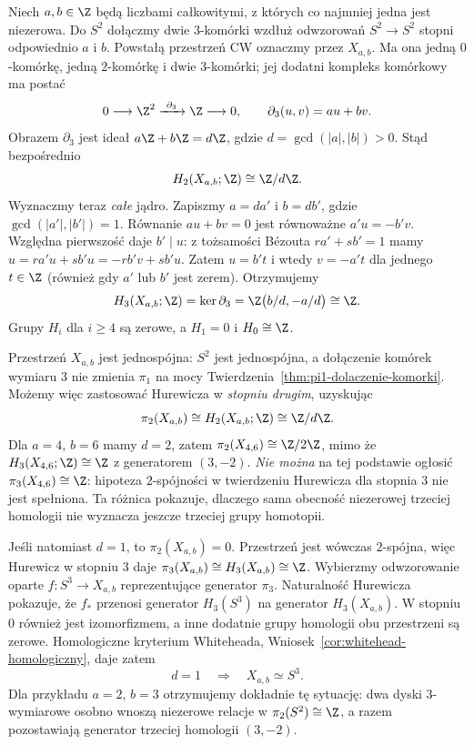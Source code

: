 \begin{przyklad}
\label{prz:dwiekrotne-dolaczenie-stopnie-dg09}
Niech $a,b\in\Z$ będą liczbami całkowitymi,
z których co najmniej jedna jest niezerowa.
Do $S^2$ dołączmy dwie $3$-komórki wzdłuż
odwzorowań $S^2\to S^2$ stopni odpowiednio $a$ i $b$.
Powstałą przestrzeń CW oznaczmy przez $X_{a,b}$.
Ma ona jedną $0$-komórkę, jedną $2$-komórkę
i dwie $3$-komórki; jej dodatni kompleks
komórkowy ma postać
\[
 0\longrightarrow \Z^2
 \xrightarrow{\ \partial_3\ }\Z\longrightarrow0,
 \qquad \partial_3(u,v)=au+bv.
\]
Obrazem $\partial_3$ jest ideał
$a\Z+b\Z=d\Z$, gdzie $d=\gcd(|a|,|b|)>0$.
Stąd bezpośrednio
\[
 H_2(X_{a,b};\Z)\cong\Z/d\Z.
\]
Wyznaczmy teraz \emph{całe} jądro.
Zapiszmy $a=da'$ i $b=db'$, gdzie
$\gcd(|a'|,|b'|)=1$. Równanie
$au+bv=0$ jest równoważne
$a'u=-b'v$.
Względna pierwszość daje $b'\mid u$:
z tożsamości Bézouta
$r a'+s b'=1$ mamy
$u=r a'u+s b'u=-r b'v+s b'u$.
Zatem $u=b't$ i wtedy $v=-a't$
dla jednego $t\in\Z$ (również gdy
$a'$ lub $b'$ jest zerem).
Otrzymujemy
\[
 H_3(X_{a,b};\Z)
 =\ker\partial_3
 =\Z\bigl(b/d,-a/d\bigr)\cong\Z.
\]
Grupy $H_i$ dla $i\geq4$ są zerowe,
a $H_1=0$ i $H_0\cong\Z$.

Przestrzeń $X_{a,b}$ jest jednospójna:
$S^2$ jest jednospójna, a dołączenie
komórek wymiaru $3$ nie zmienia $\pi_1$
na mocy
Twierdzenia~\ref{thm:pi1-dolaczenie-komorki}.
Możemy więc zastosować Hurewicza w \emph{stopniu drugim},
uzyskując
\[
 \pi_2(X_{a,b})\cong H_2(X_{a,b};\Z)
 \cong\Z/d\Z.
\]
Dla $a=4$, $b=6$ mamy $d=2$, zatem
$\pi_2(X_{4,6})\cong\Z/2\Z$, mimo że
$H_3(X_{4,6};\Z)\cong\Z$
z generatorem $(3,-2)$.
\emph{Nie można} na tej podstawie
ogłosić $\pi_3(X_{4,6})\cong\Z$:
hipoteza $2$-spójności w twierdzeniu
Hurewicza dla stopnia $3$ nie jest spełniona.
Ta różnica pokazuje, dlaczego sama obecność
niezerowej trzeciej homologii nie wyznacza
jeszcze trzeciej grupy homotopii.

Jeśli natomiast $d=1$, to $\pi_2(X_{a,b})=0$.
Przestrzeń jest wówczas $2$-spójna,
więc Hurewicz w stopniu $3$ daje
$\pi_3(X_{a,b})\cong H_3(X_{a,b})\cong\Z$.
Wybierzmy odwzorowanie oparte $f:S^3\to X_{a,b}$
reprezentujące generator $\pi_3$.
Naturalność Hurewicza pokazuje, że
$f_*$ przenosi generator $H_3(S^3)$ na generator
$H_3(X_{a,b})$.
W stopniu $0$ również jest izomorfizmem,
a inne dodatnie grupy homologii obu przestrzeni
są zerowe. Homologiczne kryterium Whiteheada,
Wniosek~\ref{cor:whitehead-homologiczny},
daje zatem
\[
 d=1\quad\Longrightarrow\quad
 X_{a,b}\simeq S^3.
\]
Dla przykładu $a=2$, $b=3$ otrzymujemy
dokładnie tę sytuację: dwa dyski
$3$-wymiarowe osobno wnoszą niezerowe
relacje w $\pi_2(S^2)\cong\Z$,
a razem pozostawiają generator trzeciej
homologii $(3,-2)$.
\end{przyklad}

